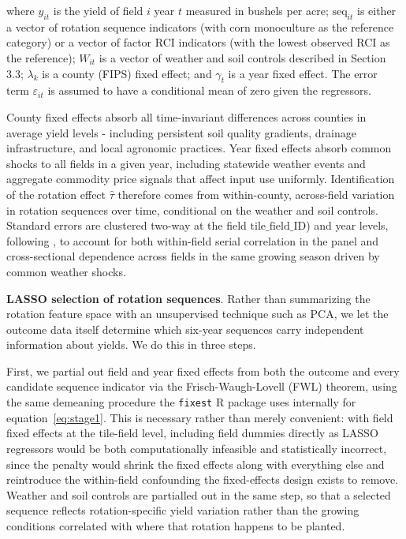 \documentclass[12pt,letterpaper]{article}
\theoremstyle{remark}
\theoremstyle{remark}
\theoremstyle{plain}
\theoremstyle{definition}
\begin{document}
where $y_{it}$ is the yield of field $i$ year $t$ measured in bushels per acre; $\text{seq}_{it}$ is either a vector of rotation sequence indicators (with corn monoculture as the reference category) or a vector of factor RCI indicators (with the lowest observed RCI as the reference); $W_{it}$ is a vector of weather and soil controls described in Section 3.3; $\lambda_{k}$ is a county (FIPS) fixed effect; and $\gamma_{t}$ is a year fixed effect. The error term $\varepsilon_{it}$ is assumed to
have a conditional mean of zero given the regressors.

County fixed effects absorb all time-invariant differences across counties in average yield levels - including persistent soil quality gradients, drainage infrastructure, and local agronomic practices. Year fixed effects absorb common shocks to all fields in a given year, including statewide weather events and aggregate commodity price signals that affect input use uniformly. Identification of the rotation effect $\hat{\tau}$ therefore comes from within-county, across-field variation in rotation sequences over time, conditional on the weather and soil controls. Standard errors are  clustered two-way at the field $\text{tile\_field\_ID}$) and year levels, following \cite{Cameron2015}, to account for both within-field serial correlation in the panel and cross-sectional dependence across fields in the same growing season driven by common weather shocks.

\medskip\noindent\textbf{LASSO selection of rotation sequences}. Rather than summarizing the rotation feature space with an unsupervised technique such as PCA, we let the outcome data itself determine which six-year sequences carry independent information about yields. We do this in three steps.

First, we partial out field and year fixed effects from both the outcome and every candidate sequence indicator via the Frisch-Waugh-Lovell (FWL) theorem, using the same demeaning procedure the \texttt{fixest} R package uses internally for equation~\eqref{eq:stage1}. This is necessary rather than merely convenient: with field fixed effects at the tile-field level, including field dummies directly as LASSO regressors would be both computationally infeasible and statistically incorrect, since the penalty would shrink the fixed effects along with everything else and reintroduce the within-field confounding the fixed-effects design exists to remove. Weather and soil controls are partialled out in the same step, so that a selected sequence reflects rotation-specific yield variation rather than the growing conditions correlated with where that rotation happens to be planted.
\end{document}
